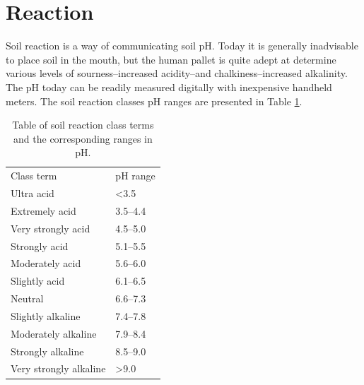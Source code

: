 \documentclass[letterpaper, 12pt]{article}
\begin{document}
\section{Reaction}
\label{reaction}

Soil reaction is a way of communicating soil pH. Today it is generally inadvisable to place soil in the mouth, but the human pallet is quite adept at determine various levels of sourness–increased acidity–and chalkiness–increased alkalinity. The pH today can be readily measured digitally with inexpensive handheld meters. The soil reaction classes pH ranges are presented in Table \ref{tab:reactionclass}.

\begin{table}[!htbp]
\centering
\caption{Table of soil reaction class terms and the corresponding ranges in pH.}
\label{tab:reactionclass}
\begin{tabular}{ll}
\hline
Class term             & pH range         \\ \hhline{==}
Ultra acid             & \textless 3.5    \\
Extremely acid         & 3.5–4.4          \\
Very strongly acid     & 4.5–5.0          \\
Strongly acid          & 5.1–5.5          \\
Moderately acid        & 5.6–6.0          \\
Slightly acid          & 6.1–6.5          \\
Neutral                & 6.6–7.3          \\
Slightly alkaline      & 7.4–7.8          \\
Moderately alkaline    & 7.9–8.4          \\
Strongly alkaline      & 8.5–9.0          \\
Very strongly alkaline & \textgreater 9.0 \\
\hline
\end{tabular}
\end{table}

\end{document}
